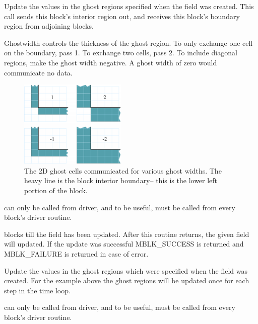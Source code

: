 \documentclass[10pt]{article}
\begin{document}
     Update the values in the ghost regions specified when the
     field was created.  This call sends this block's interior region out,
     and receives this block's boundary region from adjoining blocks.

     Ghostwidth controls the thickness of the ghost region. To only exchange
     one cell on the boundary, pass 1.  To exchange two cells, pass 2. 
     To include diagonal regions, make the ghost width negative.
     A ghost width of zero would communicate no data.

\begin{figure}[h]
\begin{center}
\includegraphics[width=2in]{fig/ghostwidth}
\end{center}
\caption{The 2D ghost cells communicated for various ghost widths.  The heavy line
is the block interior boundary-- this is the lower left portion of the block.}
\label{fig:ghostwidth}
\end{figure}      

      can only be called from driver, and to be useful,
     must be called from every block's driver routine.

      blocks till the field has been updated.
     After this routine returns, the given field will updated.
     If the update was successful MBLK\_SUCCESS is returned and 
     MBLK\_FAILURE is returned in case of error.

\vspace{0.2in}
     Update the values in the ghost regions which were specified when the
     field was created. For the example above the ghost regions will be 
     updated once for each step in the time loop.

      can only be called from driver, and to be useful,
     must be called from every block's driver routine.
\end{document}
